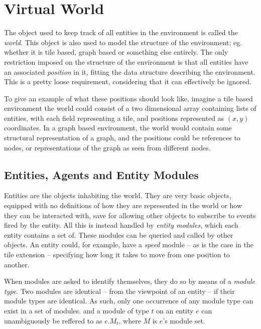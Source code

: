 
\section{Virtual World\label{sec:SystemFeaturesVirtualWorld}}

The object used to keep track of all entities in the environment is
called the \emph{world}. This object is also used to model the structure
of the environment; eg. whether it is tile based, graph based or something
else entirely. The only restriction imposed on the structure of the
environment is that all entities have an associated \emph{position}
in it, fitting the data structure describing the environment. This
is a pretty loose requirement, considering that it can effectively
be ignored.

To give an example of what these positions should look like, imagine
a tile based environment the world could consist of a two dimensional
array containing lists of entities, with each field representing a
tile, and positions represented as $(x,y)$ coordinates. In a graph
based environment, the world would contain some structural representation
of a graph, and the positions could be references to nodes, or representations
of the graph as seen from different nodes.


\subsection{Entities, Agents and Entity Modules\label{sub:SysFeatEntities}}

Entities are the objects inhabiting the world. They are very basic
objects, equipped with no definitions of how they are represented
in the world or how they can be interacted with, save for allowing
other objects to subscribe to events fired by the entity. All this
is instead handled by \emph{entity modules}, which each entity contains
a set of. These modules can be queried and called by other objects.
An entity could, for example, have a \emph{speed} module -- as is
the case in the tile extension -- specifying how long it takes to
move from one position to another.

When modules are asked to identify themselves, they do so by means
of a \emph{module type}. Two modules are identical -- from the viewpoint
of an entity -- if their module types are identical. As such, only
one occurrence of any module type can exist in a set of modules. and
a module of type $t$ on an entity $e$ can unambiguously be reffered
to as $e.M_{t}$, where $M$ is $e$'s module set. 

